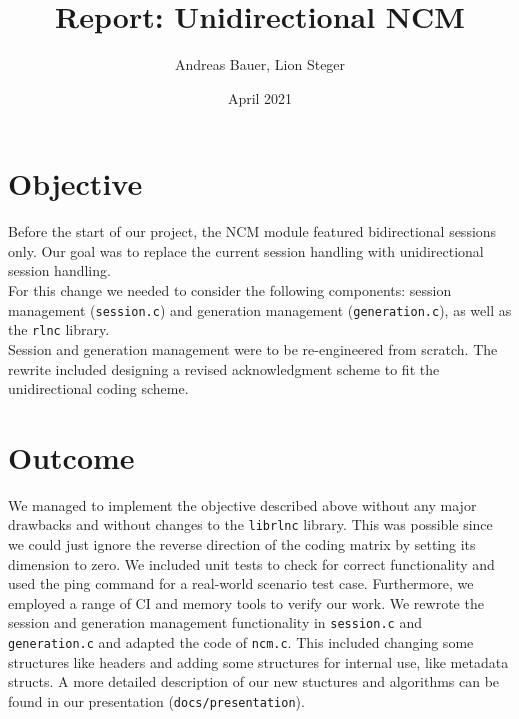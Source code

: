 \documentclass[a4paper, 11pt]{article}
\title{Report: Unidirectional NCM}
\author{Andreas Bauer, Lion Steger}
\date{April 2021}
\newcommand{\ilc}[1]{\texttt{#1}} %
\begin{document}
	\maketitle
	
	\section{Objective}
	Before the start of our project, the NCM module featured bidirectional sessions only.
	Our goal was to replace the current session handling with unidirectional session handling.
	\\
	For this change we needed to consider the following components: session management (\ilc{session.c}) and generation management (\ilc{generation.c}), as well as the \ilc{rlnc} library.
	\\
	Session and generation management were to be re-engineered from scratch.
	The rewrite included designing a revised acknowledgment scheme to fit the unidirectional coding scheme.
	
	\section{Outcome}
	We managed to implement the objective described above without any major drawbacks and without changes to the \ilc{librlnc} library. This was possible since we could just ignore the reverse direction of the coding matrix by setting its dimension to zero.
	We included unit tests to check for correct functionality and used the ping command for a real-world scenario test case. Furthermore, we employed a range of CI and memory tools to verify our work.
	We rewrote the session and generation management functionality in \ilc{session.c} and \ilc{generation.c} and adapted the code of \ilc{ncm.c}. This included changing some structures like headers and adding some structures for internal use, like metadata structs. A more detailed description of our new stuctures and algorithms can be found in our presentation (\ilc{docs/presentation}).
	
	\newpage
	
\end{document}
